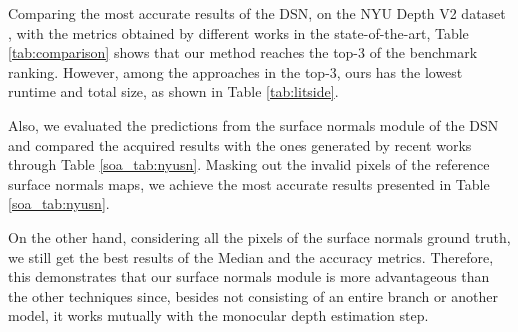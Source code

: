 \documentclass[5p]{elsarticle}
\begin{document}
Comparing the most accurate results of the DSN, on the NYU Depth V2 dataset \cite{silberman2012indoor}, with the metrics obtained by different works in the state-of-the-art, Table \ref{tab:comparison} shows that our method reaches the top-3 of the benchmark ranking. However, among the approaches in the top-3, ours has the lowest runtime and total size, as shown in Table \ref{tab:litside}. 

Also, we evaluated the predictions from the surface normals module of the DSN and compared the acquired results with the ones generated by recent works through Table \ref{soa_tab:nyusn}. Masking out the invalid pixels of the reference surface normals maps, we achieve the most accurate results presented in Table \ref{soa_tab:nyusn}. 

On the other hand, considering all the pixels of the surface normals ground truth, we still get the best results of the Median and the accuracy metrics. Therefore, this demonstrates that our surface normals module is more advantageous than the other techniques since, besides not consisting of an entire branch or another model, it works mutually with the monocular depth estimation step.
\end{document}
